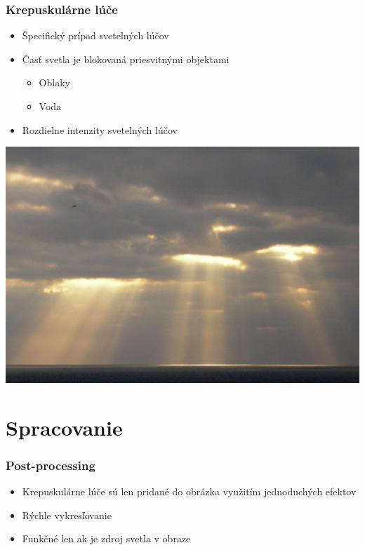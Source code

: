 \documentclass{beamer}
\begin{document}
\begin{frame}[fragile=singleslide]\frametitle{Krepuskulárne lúče}
\begin{itemize}
\item Špecifický prípad svetelných lúčov
\item Časť svetla je blokovaná priesvitnými objektami
	\begin{itemize}
	\item Oblaky
	\item Voda
	\end{itemize}
\item Rozdielne intenzity svetelných lúčov
\end{itemize}
\begin{center}
\includegraphics[scale=.15]{god_ray.jpg}
\end{center}
\end{frame}

\section{Spracovanie}

\begin{frame}[fragile=singleslide]\frametitle{Post-processing}
\begin{itemize}
\item Krepuskulárne lúče sú len pridané do obrázka využitím jednoduchých efektov
\item Rýchle vykresľovanie
\item Funkčné len ak je zdroj svetla v obraze
\end{itemize}
\end{frame}
\end{document}
